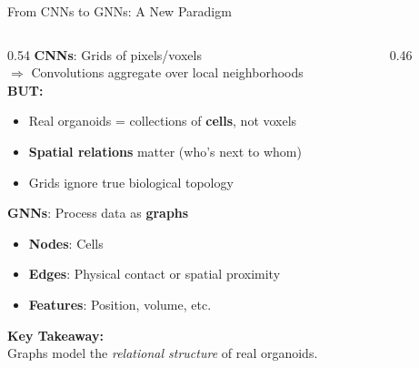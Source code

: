 \documentclass[aspectratio=169]{beamer}
\begin{document}
\begin{frame}{From CNNs to GNNs: A New Paradigm}
    \begin{columns}
        \begin{column}{0.54\textwidth}
            \textbf{CNNs}: Grids of pixels/voxels \\
            \hspace{0.5em} $\Rightarrow$ Convolutions aggregate over local neighborhoods\\
            \vspace{0.8em}
            \textbf{BUT:}\\
            \begin{itemize}
                \item Real organoids = collections of \textbf{cells}, not voxels
                \item \textbf{Spatial relations} matter (who's next to whom)
                \item Grids ignore true biological topology
            \end{itemize}
            \vspace{1em}
            \textbf{GNNs}: Process data as \textbf{graphs}
            \begin{itemize}
                \item \textbf{Nodes}: Cells\\
                \item \textbf{Edges}: Physical contact or spatial proximity\\
                \item \textbf{Features}: Position, volume, etc.
            \end{itemize}
            \vspace{1em}
            \textbf{Key Takeaway:} \\
            \textcolor{inriaBlue}{Graphs model the \textit{relational structure} of real organoids.}
        \end{column}
        \begin{column}{0.46\textwidth}
            \begin{center}

\end{center}
\end{column}
\end{columns}
\end{frame}
\end{document}

